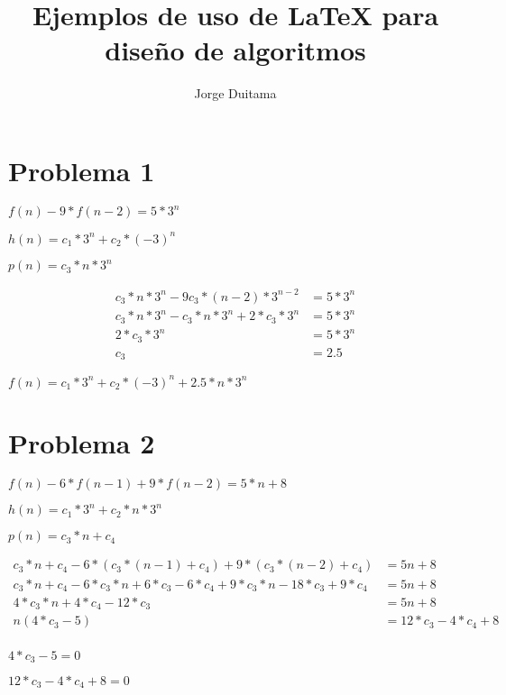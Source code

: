 \documentclass[]{article}
\begin{document}
	
	
\title{Ejemplos de uso de LaTeX para diseño de algoritmos}
	
\author{Jorge Duitama}
	
\maketitle

\section{Problema 1}

$f(n) - 9*f(n-2) = 5*3^n $

$h(n) = c_1*3^n + c_2*(-3)^n$

$p(n) = c_3*n*3^n$

\begin{align*}
 c_3* n* 3^n -9c_3*(n-2)*3^{n-2} &= 5*3^n  \\
 c_3* n* 3^n - c_3* n* 3^n + 2*c_3* 3^n  &= 5*3^n \\
 2*c_3* 3^n  &= 5*3^n \\
 c_3 &= 2.5
\end{align*}

$f(n) = c_1*3^n + c_2*(-3)^n + 2.5*n*3^n$

\section{Problema 2}
$f(n) -6*f(n-1) + 9*f(n-2) = 5*n+8$

$h(n) = c_1*3^n + c_2*n*3^n$

$p(n) = c_3*n + c_4$

\begin{align*}
c_3*n + c_4 - 6 *(c_3*(n-1) + c_4) + 9 *(c_3*(n-2) + c_4) &= 5n+8 \\
c_3*n + c_4 - 6*c_3*n + 6*c_3 - 6*c_4 + 9*c_3*n - 18*c_3 +9*c_4 &= 5n+8 \\
4*c_3*n +4*c_4 -12*c_3  &= 5n+8 \\
n(4*c_3 - 5) &= 12*c_3 - 4*c_4 + 8 \\
\end{align*}

$4*c_3 - 5 = 0$

$12*c_3 - 4*c_4 + 8 = 0$
\end{document}
